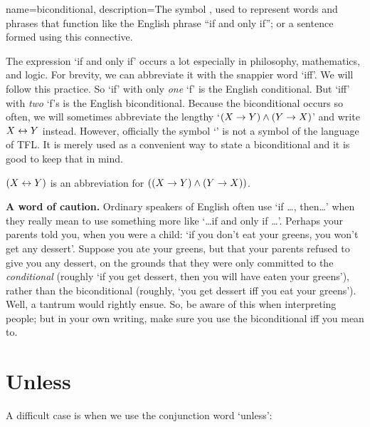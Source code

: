 {
name=biconditional,
description={The symbol \eiff, used to represent words and phrases that function like the English phrase ``if and only if''; or a sentence formed using this connective.}}


The expression `if and only if' occurs a lot especially in philosophy, mathematics, and logic. For brevity, we can abbreviate it with the snappier word `iff'. We will follow this practice. So `if' with only \emph{one} `f' is the English conditional. But `iff' with \emph{two} `f's is the English biconditional. Because the biconditional occurs so often, we will sometimes abbreviate the lengthy `$(X\rightarrow Y)\mathbin{\wedge}(Y\rightarrow X)$' and write $X\leftrightarrow Y$ instead. However, officially the symbol `\eiff' is not a symbol of the language of TFL. It is merely used as a convenient way to state a biconditional and it is good to keep that in mind.

\begin{highlighted}
	$(X\leftrightarrow Y)$ is an abbreviation for $((X\rightarrow Y)\mathbin{\wedge}(Y\rightarrow X))$.
\end{highlighted}

\textbf{A word of caution.} Ordinary speakers of English often use `if \ldots, then\ldots' when they really mean to use something more like `\ldots if and only if \ldots'. Perhaps your parents told you, when you were a child: `if you don't eat your greens, you won't get any dessert'. Suppose you ate your greens, but that your parents refused to give you any dessert, on the grounds that they were only committed to the \emph{conditional} (roughly `if you get dessert, then you will have eaten your greens'), rather than the biconditional (roughly, `you get dessert iff you eat your greens'). Well, a tantrum would rightly ensue. So, be aware of this when interpreting people; but in your own writing, make sure you use the biconditional iff you mean to.

\section{Unless}
A difficult case is when we use the conjunction word `unless':

